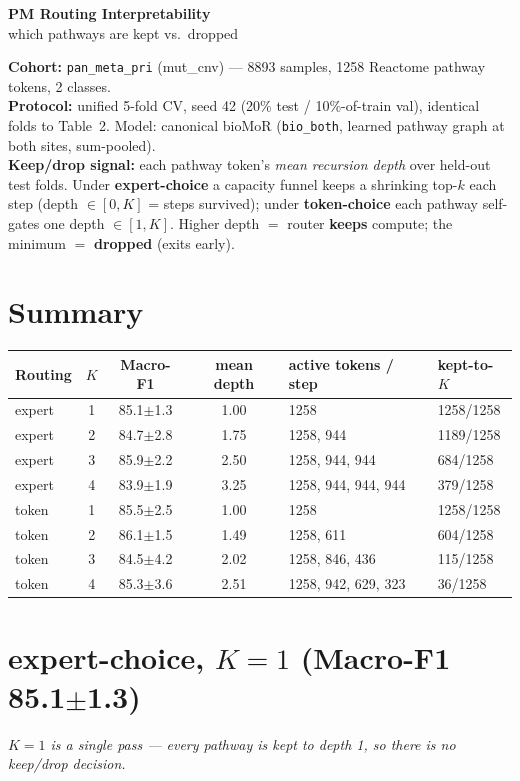 \documentclass[10pt]{article}
\begin{document}
\begin{center}{\LARGE\bfseries PM Routing Interpretability}\\[2pt]{\large which pathways are kept vs.\ dropped}\end{center}
\vspace{2pt}
\noindent\textbf{Cohort:} \texttt{pan\_meta\_pri} (mut\_cnv) ---
8893 samples, 1258 Reactome pathway tokens, 2 classes.\\
\textbf{Protocol:} unified 5-fold CV, seed 42 (20\% test / 10\%-of-train val),
identical folds to Table~2. Model: canonical bioMoR (\texttt{bio\_both}, learned pathway
graph at both sites, sum-pooled).\\
\textbf{Keep/drop signal:} each pathway token's \emph{mean recursion depth} over held-out
test folds. Under \textbf{expert-choice} a capacity funnel keeps a shrinking top-$k$ each step
(depth $\in[0,K]$ = steps survived); under \textbf{token-choice} each pathway self-gates one
depth $\in[1,K]$. Higher depth $=$ router \textbf{keeps} compute; the minimum $=$
\textbf{dropped} (exits early).

\section*{Summary}
\begin{center}\begin{tabular}{@{}l c c c l l@{}}
\toprule
Routing & $K$ & Macro-F1 & mean depth & active tokens / step & kept-to-$K$ \\
\midrule
expert & 1 & 85.1$\pm$1.3 & 1.00 & 1258 & 1258/1258 \\
expert & 2 & 84.7$\pm$2.8 & 1.75 & 1258, 944 & 1189/1258 \\
expert & 3 & 85.9$\pm$2.2 & 2.50 & 1258, 944, 944 & 684/1258 \\
expert & 4 & 83.9$\pm$1.9 & 3.25 & 1258, 944, 944, 944 & 379/1258 \\
token & 1 & 85.5$\pm$2.5 & 1.00 & 1258 & 1258/1258 \\
token & 2 & 86.1$\pm$1.5 & 1.49 & 1258, 611 & 604/1258 \\
token & 3 & 84.5$\pm$4.2 & 2.02 & 1258, 846, 436 & 115/1258 \\
token & 4 & 85.3$\pm$3.6 & 2.51 & 1258, 942, 629, 323 & 36/1258 \\
\bottomrule\end{tabular}\end{center}
\section*{expert-choice, $K=1$  (Macro-F1 85.1$\pm$1.3)}
\emph{$K{=}1$ is a single pass --- every pathway is kept to depth 1, so there is no keep/drop decision.}
\end{document}
